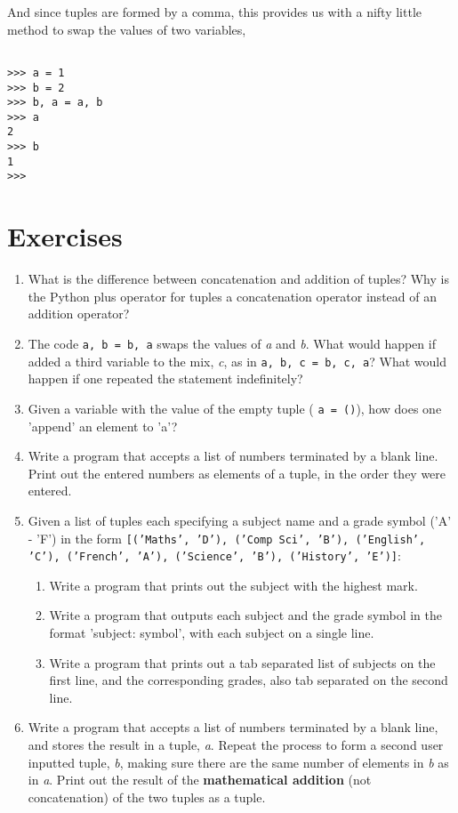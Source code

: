 And since tuples are formed by a comma, this provides us with a   nifty little method to swap the values of two variables,
\begin{lstlisting}

>>> a = 1
>>> b = 2
>>> b, a = a, b
>>> a
2
>>> b
1
>>>
\end{lstlisting}

\section{Exercises}
\begin{enumerate}
	\item What is the difference between concatenation and addition of    tuples? Why is the Python plus operator for tuples a concatenation    operator instead of an addition operator?
	\item The code 
\texttt{a, b = b, a} swaps the values of \textit{a}    and \textit{b}. What would happen if added a third variable to the    mix, \textit{c}, as in 
\texttt{a, b, c = b, c, a}? What would    happen if one repeated the statement indefinitely?
	\item Given a variable with the value of the empty tuple (
\texttt{a =    ()}), how does one 'append' an element to 'a'?
	\item Write a program that accepts a list of numbers terminated by a    blank line. Print out the entered numbers as elements of a tuple, in    the order they were entered.
	\item Given a list of tuples each specifying a subject name and a    grade symbol ('A' - 'F') in the form 
\texttt{[('Maths', 'D'),    ('Comp Sci', 'B'), ('English', 'C'), ('French', 'A'),    ('Science', 'B'), ('History', 'E')]}: 
\begin{enumerate}
	\item Write a program that prints out the subject with the highest     mark.
	\item Write a program that outputs each subject and the grade     symbol in the format 'subject: symbol', with each subject on a     single line.
	\item Write a program that prints out a tab separated list of     subjects on the first line, and the corresponding grades, also     tab separated on the second line.
\end{enumerate}
	\item Write a program that accepts a list of numbers terminated by a    blank line, and stores the result in a tuple, \textit{a}. Repeat the    process to form a second user inputted tuple, \textit{b}, making    sure there are the same number of elements in \textit{b} as in    \textit{a}. Print out the result of the \textbf{mathematical    addition} (not concatenation) of the two tuples as a    tuple.

\end{enumerate}
